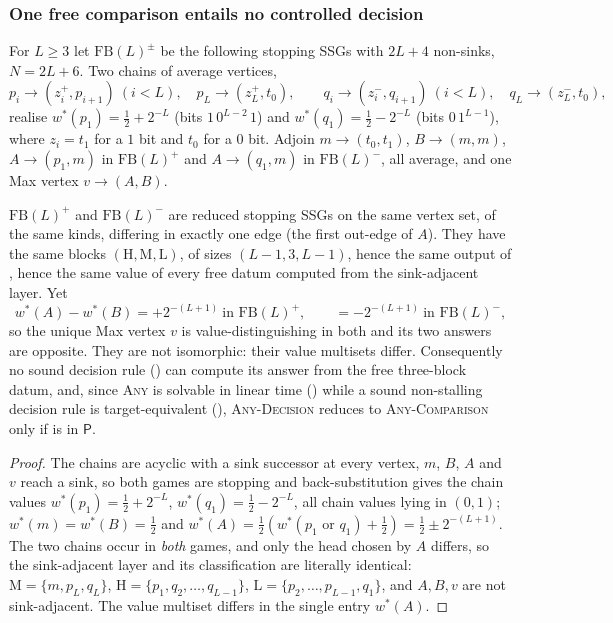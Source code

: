\subsubsection*{One free comparison entails no controlled decision}

\begin{definition}\label{def:wo-fb}
For $L\ge3$ let $\mathrm{FB}(L)^{\pm}$ be the following stopping SSGs with
$2L+4$ non-sinks, $N=2L+6$. Two chains of average vertices,
\[
  p_i\to(z^{+}_i,p_{i+1})\ (i<L),\quad p_L\to(z^{+}_L,t_0),\qquad
  q_i\to(z^{-}_i,q_{i+1})\ (i<L),\quad q_L\to(z^{-}_L,t_0),
\]
realise $w^\ast(p_1)=\tfrac12+2^{-L}$ (bits $1\,0^{L-2}\,1$) and
$w^\ast(q_1)=\tfrac12-2^{-L}$ (bits $0\,1^{L-1}$), where $z_i=t_1$ for a $1$
bit and $t_0$ for a $0$ bit. Adjoin $m\to(t_0,t_1)$, $B\to(m,m)$,
$A\to(p_1,m)$ in $\mathrm{FB}(L)^{+}$ and $A\to(q_1,m)$ in
$\mathrm{FB}(L)^{-}$, all average, and one Max vertex $v\to(A,B)$.
\end{definition}

\begin{proposition}\label{prop:wo-free-blind}
$\mathrm{FB}(L)^{+}$ and $\mathrm{FB}(L)^{-}$ are reduced stopping SSGs on the
same vertex set, of the same kinds, differing in exactly one edge (the first
out-edge of $A$). They have the same blocks
$(\mathrm H,\mathrm M,\mathrm L)$, of sizes $(L-1,3,L-1)$, hence the same
output of , hence the same value of every
free datum computed from the sink-adjacent layer. Yet
\[
  w^\ast(A)-w^\ast(B)=+2^{-(L+1)}\ \text{in }\mathrm{FB}(L)^{+},\qquad
  =-2^{-(L+1)}\ \text{in }\mathrm{FB}(L)^{-},
\]
so the unique Max vertex $v$ is value-distinguishing in both and its two
answers are opposite. They are not isomorphic: their value multisets differ.
Consequently no sound decision rule () can compute its
answer from the free three-block datum, and, since \textsc{Any} is solvable in
linear time () while a sound non-stalling decision rule
is target-equivalent (), \textsc{Any-Decision} reduces
to \textsc{Any-Comparison} only if  is in $\mathsf P$.
\end{proposition}

\begin{proof}
The chains are acyclic with a sink successor at every vertex, $m$, $B$, $A$ and
$v$ reach a sink, so both games are stopping and back-substitution gives the
chain values $w^\ast(p_1)=\tfrac12+2^{-L}$, $w^\ast(q_1)=\tfrac12-2^{-L}$, all
chain values lying in $(0,1)$; $w^\ast(m)=w^\ast(B)=\tfrac12$ and
$w^\ast(A)=\tfrac12(w^\ast(p_1\text{ or }q_1)+\tfrac12)=\tfrac12\pm2^{-(L+1)}$.
The two chains occur in \emph{both} games, and only the head chosen by $A$
differs, so the sink-adjacent layer and its classification are literally
identical: $\mathrm M=\{m,p_L,q_L\}$, $\mathrm H=\{p_1,q_2,\dots,q_{L-1}\}$,
$\mathrm L=\{p_2,\dots,p_{L-1},q_1\}$, and $A,B,v$ are not sink-adjacent. The
value multiset differs in the single entry $w^\ast(A)$.
\end{proof}

